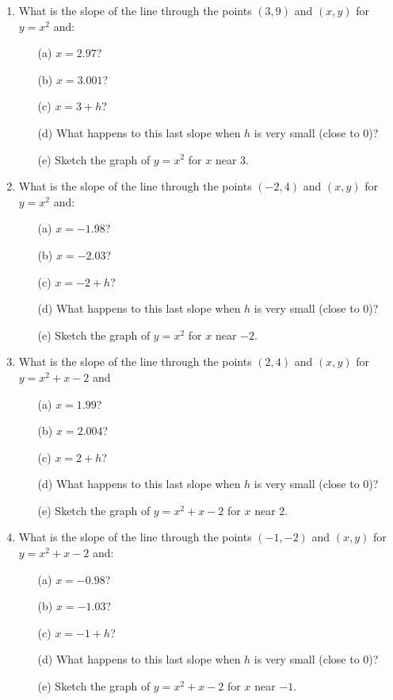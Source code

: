 \begin{enumerate}
\item	What is the slope of the line through the points $(3,9)$  and  $(x, y)$  for $y = x^2$ and:
    \begin{itemize}
    \item[(a)] $x = 2.97$?   
    \item[(b)] $x = 3.001$?   
	\item[(c)] $x = 3+h$?   
    \item[(d)] What happens to this last slope when $h$  is very small (close to 0)?   
    \item[(e)] Sketch the graph of $y = x^2$  for  $x$  near  $3$.
    \end{itemize}

\item	What is the slope of the line through  the points $(-2,4)$  and  $(x, y)$  for $y = x^2$  and:
    \begin{itemize}
    \item[(a)] $x = -1.98$?   
    \item[(b)] $x = -2.03$?   
	\item[(c)] $x = -2+h$?   
    \item[(d)] What happens to this last slope when $h$  is very small (close to 0)?   
    \item[(e)] Sketch the graph of $y = x^2$  for  $x$  near  $-2$.
    \end{itemize}    
 
\item	What is the slope of the line through  the points $(2,4)$  and  $(x, y)$  for $y = x^2 + x - 2$   and  
\begin{itemize}
    \item[(a)] $x = 1.99$?   
    \item[(b)] $x = 2.004$?   
	\item[(c)] $x = 2+h$?   
    \item[(d)] What happens to this last slope when $h$  is very small (close to 0)?   
    \item[(e)] Sketch the graph of $y = x^2+x-2$  for  $x$  near  $2$.
    \end{itemize} 

\item	What is the slope of the line through the points $(-1,-2)$  and  $(x, y)$  for $y = x^2 +x - 2$  and:
\begin{itemize}
    \item[(a)] $x = -0.98$?   
    \item[(b)] $x = -1.03$?   
	\item[(c)] $x = -1+h$?   
    \item[(d)] What happens to this last slope when $h$  is very small (close to 0)?   
    \item[(e)] Sketch the graph of $y = x^2+x-2$  for  $x$  near  $-1$.
    \end{itemize} 


\end{enumerate}
